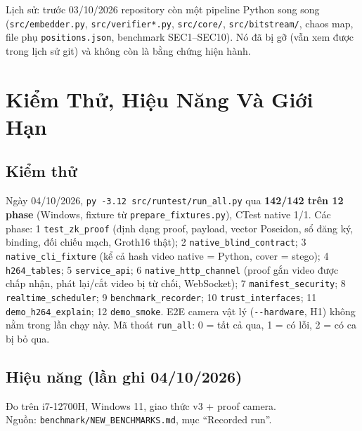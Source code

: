 \documentclass[11pt,a4paper]{article}
\begin{document}
Lịch sử: trước 03/10/2026 repository còn một pipeline Python song song
(\texttt{src/embedder.py}, \texttt{src/verifier*.py}, \texttt{src/core/},
\texttt{src/bitstream/}, chaos map, file phụ \texttt{positions.json}, benchmark
SEC1--SEC10). Nó đã bị gỡ (vẫn xem được trong lịch sử git) và không còn là bằng
chứng hiện hành.

\section{Kiểm Thử, Hiệu Năng Và Giới Hạn}

\subsection{Kiểm thử}

Ngày 04/10/2026, \texttt{py -3.12 src/runtest/run\_all.py} qua \textbf{142/142 trên
12 phase} (Windows, fixture từ \texttt{prepare\_fixtures.py}), CTest native 1/1. Các
phase: 1 \texttt{test\_zk\_proof} (định dạng proof, payload, vector Poseidon, sổ đăng
ký, binding, đối chiếu mạch, Groth16 thật); 2 \texttt{native\_blind\_contract};
3 \texttt{native\_cli\_fixture} (kể cả hash video native = Python, cover = stego);
4 \texttt{h264\_tables}; 5 \texttt{service\_api}; 6 \texttt{native\_http\_channel}
(proof gắn video được chấp nhận, phát lại/cắt video bị từ chối, WebSocket);
7 \texttt{manifest\_security}; 8 \texttt{realtime\_scheduler}; 9
\texttt{benchmark\_recorder}; 10 \texttt{trust\_interfaces}; 11
\texttt{demo\_h264\_explain}; 12 \texttt{demo\_smoke}. E2E camera vật lý
(\texttt{-{}-hardware}, H1) không nằm trong lần chạy này. Mã thoát \texttt{run\_all}:
0 = tất cả qua, 1 = có lỗi, 2 = có ca bị bỏ qua.

\subsection{Hiệu năng (lần ghi 04/10/2026)}

Đo trên i7-12700H, Windows 11, giao thức v3 + proof camera.\\
Nguồn: \texttt{benchmark/NEW\_BENCHMARKS.md}, mục ``Recorded run''.
\end{document}
